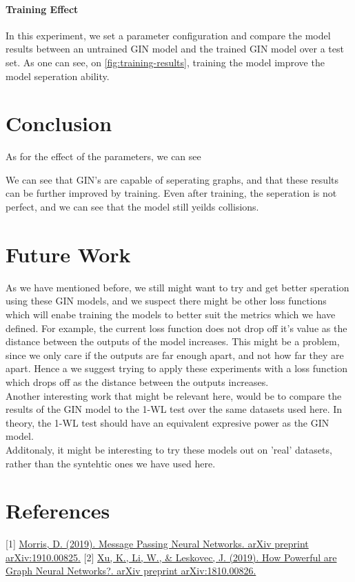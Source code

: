 \documentclass{article}
\begin{document}
\subsection*{Training Effect}
In this experiment, we set a parameter configuration and compare the model results between an untrained GIN model
and the trained GIN model over a test set.
As one can see, on \ref{fig:training-results}, training the model improve the model seperation ability.

\part*{Conclusion}
As for the effect of the parameters, we can see %

We can see that GIN's are capable of seperating graphs, and that these results can be further improved by training.
Even after training, the seperation is not perfect, and we can see that the model still yeilds collisions.


\part*{Future Work}
As we have mentioned before, we still might want to try and get better speration using these GIN models,
and we suspect there might be other loss functions which will enabe training the models to better suit
the metrics which we have defined. For example, the current loss function does not drop off it's value
as the distance between the outputs of the model increases. This might be a problem, since we
only care if the outputs are far enough apart, and not how far they are apart. Hence a we suggest trying to
apply these experiments with a loss function which drops off as the distance between the outputs increases.\\
Another interesting work that might be relevant here, would be to compare the results of the GIN model to
the 1-WL test over the same datasets used here. In theory, the 1-WL test should have an equivalent expresive power as
the GIN model.\\
Additonaly, it might be interesting to try these models out on 'real' datasets,
rather than the syntehtic ones we have used here. \\

\part*{References}
[1] \href{https://arxiv.org/abs/2202.00645}{Morris, D. (2019). Message Passing Neural Networks. arXiv preprint arXiv:1910.00825.}
[2] \href{https://arxiv.org/abs/2202.00645}{Xu, K., Li, W., \& Leskovec, J. (2019). How Powerful are Graph Neural Networks?. arXiv preprint arXiv:1810.00826.}
\end{document}
